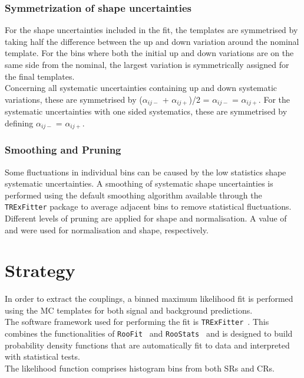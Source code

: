 \subsubsection{Symmetrization of shape uncertainties} 
For the shape uncertainties included in the fit, the templates are symmetrised by
taking half the difference between the up and down variation around
the nominal template. For the bins where both the initial up and down
variations are on the same side from the nominal, the largest
variation is symmetrically assigned for the final templates.\\
Concerning all systematic uncertainties containing up and down
systematic variations, these are symmetrised by 
($\alpha_{ij-}$ + $\alpha_{ij+}$)/2 = $\alpha_{ij-}$ = $\alpha_{ij+}$. 
For the systematic uncertainties with one sided systematics, these
are symmetrised by defining $\alpha_{ij-}$ = $\alpha_{ij+}$.

\subsubsection{Smoothing and Pruning} 
Some fluctuations in individual bins can be caused
by the low statistics shape systematic uncertainties. A smoothing of
systematic shape uncertainties is performed using the default
smoothing algorithm available through the \texttt{TRExFitter} package
to average adjacent bins to remove statistical fluctuations. \\
Different levels of pruning are applied for shape
and normalisation. A value of \prunenorm and \pruneshape were used for
normalisation and shape, respectively. 


\section {Strategy}
\label{sec:stat:strategy}

In order to extract the \tZc couplings, a binned maximum
likelihood fit is performed using the MC templates for both signal and
background predictions.\\
The software framework used for performing the fit is \texttt{TRExFitter}~\cite{TRexfitter}.
This combines the functionalities of
\texttt{RooFit}~\cite{Verkerke:2003ir} and
\texttt{RooStats}~\cite{Moneta:2010pm} and is designed to build
probability density functions that are automatically fit to data and
interpreted with statistical tests.\\
The likelihood function comprises histogram bins from both SRs and
CRs.

